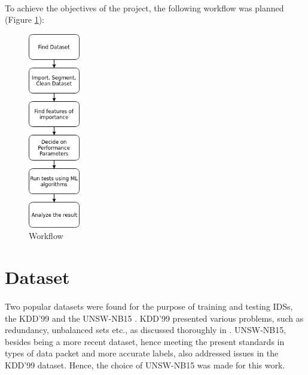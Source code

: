 \paragraph{}
To achieve the objectives of the project, the following workflow was planned (Figure \ref{workflow}):
\begin{figure}[h]
    \hfill\includegraphics[width=0.2\textwidth]{Chapter3/workflow}\hspace*{\fill}
    \caption{Workflow}
    \label{workflow}
\end{figure}

\section{Dataset}
\paragraph{}
Two popular datasets were found for the purpose of training and testing IDSs, the KDD'99 \cite{kdd99} and the UNSW-NB15 \cite{unsw15}. KDD'99 presented various problems, such as redundancy, unbalanced sets etc., as discussed thoroughly in \cite{unsw_comparison}. UNSW-NB15, besides being a more recent dataset, hence meeting the present standards in types of data packet and more accurate labels, also addressed issues in the KDD'99 dataset. Hence, the choice of UNSW-NB15 was made for this work.

